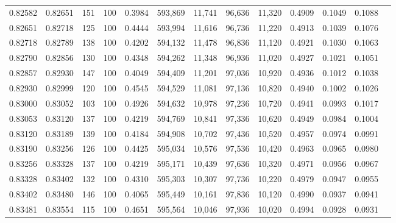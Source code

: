 \begin{tabular}{rrrrrrrrrrrrr}
0.82582 & 0.82651 &   151 & 100 &                                     0.3984 & 593,869 &  11,741 &  96,636 &  11,320 & 0.4909 & 0.1049 & 0.1088 \\
0.82651 & 0.82718 &   125 & 100 &                                     0.4444 & 593,994 &  11,616 &  96,736 &  11,220 & 0.4913 & 0.1039 & 0.1076 \\
0.82718 & 0.82789 &   138 & 100 &                                     0.4202 & 594,132 &  11,478 &  96,836 &  11,120 & 0.4921 & 0.1030 & 0.1063 \\
0.82790 & 0.82856 &   130 & 100 &                                     0.4348 & 594,262 &  11,348 &  96,936 &  11,020 & 0.4927 & 0.1021 & 0.1051 \\
0.82857 & 0.82930 &   147 & 100 &                                     0.4049 & 594,409 &  11,201 &  97,036 &  10,920 & 0.4936 & 0.1012 & 0.1038 \\
0.82930 & 0.82999 &   120 & 100 &                                     0.4545 & 594,529 &  11,081 &  97,136 &  10,820 & 0.4940 & 0.1002 & 0.1026 \\
0.83000 & 0.83052 &   103 & 100 &                                     0.4926 & 594,632 &  10,978 &  97,236 &  10,720 & 0.4941 & 0.0993 & 0.1017 \\
0.83053 & 0.83120 &   137 & 100 &                                     0.4219 & 594,769 &  10,841 &  97,336 &  10,620 & 0.4949 & 0.0984 & 0.1004 \\
0.83120 & 0.83189 &   139 & 100 &                                     0.4184 & 594,908 &  10,702 &  97,436 &  10,520 & 0.4957 & 0.0974 & 0.0991 \\
0.83190 & 0.83256 &   126 & 100 &                                     0.4425 & 595,034 &  10,576 &  97,536 &  10,420 & 0.4963 & 0.0965 & 0.0980 \\
0.83256 & 0.83328 &   137 & 100 &                                     0.4219 & 595,171 &  10,439 &  97,636 &  10,320 & 0.4971 & 0.0956 & 0.0967 \\
0.83328 & 0.83402 &   132 & 100 &                                     0.4310 & 595,303 &  10,307 &  97,736 &  10,220 & 0.4979 & 0.0947 & 0.0955 \\
0.83402 & 0.83480 &   146 & 100 &                                     0.4065 & 595,449 &  10,161 &  97,836 &  10,120 & 0.4990 & 0.0937 & 0.0941 \\
0.83481 & 0.83554 &   115 & 100 &                                     0.4651 & 595,564 &  10,046 &  97,936 &  10,020 & 0.4994 & 0.0928 & 0.0931 \\

\end{tabular}
